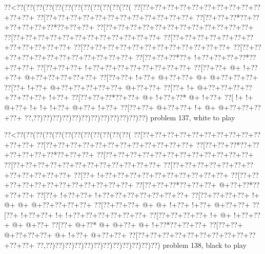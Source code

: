 \vbox{\vbox{\goo
\0??<\0??(\0??(\0??(\0??(\0??(\0??(\0??(\0??(\0??(\0??(\0??(\0??(
\0??[\0??+\0??+\0??+\0??+\0??+\0??+\0??+\0??+\0??+\0??+\0??+\0??+
\0??[\0??+\0??+\0??+\0??+\0??+\0??+\0??+\0??+\0??+\0??+\0??+\0??+
\0??[\0??+\0??+\0??*\0??+\0??+\0??+\0??+\0??+\0??*\0??+\0??+\0??+
\0??[\0??+\0??+\0??+\0??+\0??+\0??+\0??+\0??+\0??+\0??+\0??+\0??+
\0??[\0??+\0??+\0??+\0??+\0??+\0??+\0??+\0??+\0??+\0??+\0??+\0??+
\0??[\0??+\0??+\0??+\0??+\0??+\0??+\0??+\0??+\0??+\0??+\0??+\0??+
\0??[\0??+\0??+\0??+\0??+\0??+\0??+\0??+\0??+\0??+\0??+\0??+\0??+
\0??[\0??+\0??+\0??+\0??+\0??+\0??+\0??+\0??+\0??+\0??+\0??+\0??+
\0??[\0??+\0??+\0??*\0??+\- !+\0??+\0??+\0??+\0??*\0??+\0??+\0??+
\0??[\0??+\0??+\0??+\- !+\0??+\0??+\0??+\0??+\0??+\0??+\0??+\0??+
\0??[\0??+\0??+\- @+\- !+\0??+\0??+\- @+\0??+\0??+\0??+\0??+\0??+
\0??[\0??+\0??+\- !+\0??+\- @+\0??+\0??+\- @+\- @+\0??+\0??+\0??+
\0??[\0??+\- !+\0??+\- @+\0??+\0??+\0??+\0??+\0??+\- @+\0??+\0??+
\0??[\0??+\- !+\- @+\0??+\0??+\0??+\0??+\0??+\0??+\0??+\- !+\0??+
\0??[\0??+\0??+\0??*\0??+\0??+\- @+\- !+\0??+\0??*\- @+\- !+\0??+
\0??[\- !+\- !+\- @+\0??+\- !+\- !+\- !+\0??+\- @+\0??+\- !+\0??+
\0??[\0??+\0??+\- @+\0??+\0??+\- !+\- @+\- @+\0??+\0??+\0??+\0??+
\0??,\0??)\0??)\0??)\0??)\0??)\0??)\0??)\0??)\0??)\0??)\0??)\0??)
}
\hfil problem 137, white to play\hfil\break
}

\vbox{\vbox{\goo
\0??<\0??(\0??(\0??(\0??(\0??(\0??(\0??(\0??(\0??(\0??(\0??(\0??(
\0??[\0??+\0??+\0??+\0??+\0??+\0??+\0??+\0??+\0??+\0??+\0??+\0??+
\0??[\0??+\0??+\0??+\0??+\0??+\0??+\0??+\0??+\0??+\0??+\0??+\0??+
\0??[\0??+\0??+\0??*\0??+\0??+\0??+\0??+\0??+\0??*\0??+\0??+\0??+
\0??[\0??+\0??+\0??+\0??+\0??+\0??+\0??+\0??+\0??+\0??+\0??+\0??+
\0??[\0??+\0??+\0??+\0??+\0??+\0??+\0??+\0??+\0??+\0??+\0??+\0??+
\0??[\0??+\0??+\0??+\0??+\0??+\0??+\0??+\0??+\0??+\0??+\0??+\0??+
\0??[\0??+\- !+\0??+\0??+\0??+\0??+\0??+\0??+\0??+\0??+\0??+\0??+
\0??[\0??+\0??+\0??+\0??+\0??+\0??+\0??+\0??+\0??+\0??+\0??+\0??+
\0??[\0??+\0??+\0??*\0??+\0??+\0??+\- @+\0??+\0??*\0??+\0??+\0??+
\0??[\0??+\- !+\0??+\0??+\- !+\0??+\0??+\0??+\0??+\0??+\0??+\0??+
\0??[\0??+\0??+\0??+\0??+\- !+\- @+\- @+\- @+\0??+\0??+\0??+\0??+
\0??[\0??+\0??+\0??+\- @+\- @+\- !+\0??+\- !+\0??+\- @+\0??+\0??+
\0??[\0??+\- !+\0??+\0??+\- !+\- !+\0??+\0??+\0??+\0??+\0??+\0??+
\0??[\0??+\0??+\0??+\0??+\- !+\- @+\- !+\0??+\0??+\- @+\- @+\0??+
\0??[\0??+\- @+\0??*\- @+\- @+\0??+\- @+\- !+\0??*\0??+\0??+\0??+
\0??[\0??+\0??+\- @+\0??+\0??+\0??+\- @+\- !+\0??+\- @+\0??+\0??+
\0??[\0??+\0??+\0??+\0??+\0??+\0??+\0??+\0??+\0??+\0??+\0??+\0??+
\0??,\0??)\0??)\0??)\0??)\0??)\0??)\0??)\0??)\0??)\0??)\0??)\0??)
}
\hfil problem 138, black to play\hfil\break
}

